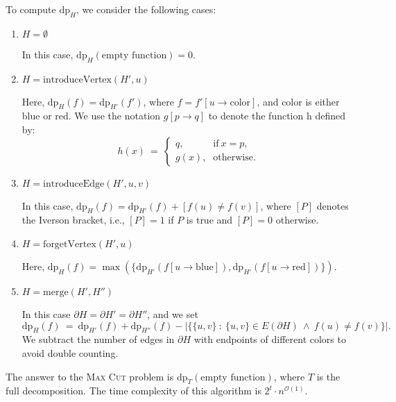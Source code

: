 \documentclass[12pt]{article}
\begin{document}
	\medskip
	
	To compute \(\text{dp}_{H}\), we consider the following cases:
	\begin{enumerate}
		\item \(H = \emptyset\)
		      
		      In this case, \(\text{dp}_{H}(\text{empty function}) = 0\).
		
		\item \(H = \text{introduceVertex}(H', u)\)
		      
		      Here, \(\text{dp}_{H}(f) = \text{dp}_{H'}(f')\), where \(f =
		      f'[u \to \text{color}]\), and color is either blue or red. We use
		      the notation \(g[p \to q]\) to denote the function h defined by:
		      \[ h(x) \ = \ \begin{cases} q \text{,} & \text{if} \ x = p
		      \text{,} \\
		      g(x) \text{,} & \text{otherwise.} \end{cases} \]
		
		\item \(H = \text{introduceEdge}(H', u, v)\)
		      
		      In this case, \(\text{dp}_{H}(f) = \text{dp}_{H'}(f) + [f(u) \neq
		      f(v)]\), where \([P]\) denotes the Iverson bracket, i.e., \([P] =
		      1\) if \(P\) is true and \([P] = 0\) otherwise.
		
		\item \(H = \text{forgetVertex}(H', u)\)
		      
		      Here, \(\text{dp}_{H}(f) = \max(\{
		      \text{dp}_{H'}(f[u \to \text{blue}]),
		      \text{dp}_{H'}(f[u \to \text{red}])\})\).
		
		\item \(H = \text{merge}(H', H'')\)
		      
		      In this case \(\partial H = \partial H' = \partial H''\), and we
		      set
		      \[ \text{dp}_{H}(f) \ = \ \text{dp}_{H'}(f) + \text{dp}_{H''}(f) -
		      |\{\{u, v\} \ : \ \{u, v\} \in E(\partial H) \ \wedge \ f(u) \neq
		      f(v)\}| \text{.} \]
		      We subtract the number of edges in \(\partial H\) with endpoints
		      of different colors to avoid double counting.
	\end{enumerate}
	The answer to the \textsc{Max Cut} problem is
	\(\text{dp}_{T}(\text{empty function})\), where \(T\) is the full
	decomposition. The time complexity of this algorithm is \(2^{t} \cdot
	n^{\mathcal{O}(1)}\).
	
	\medskip
	
\end{document}
